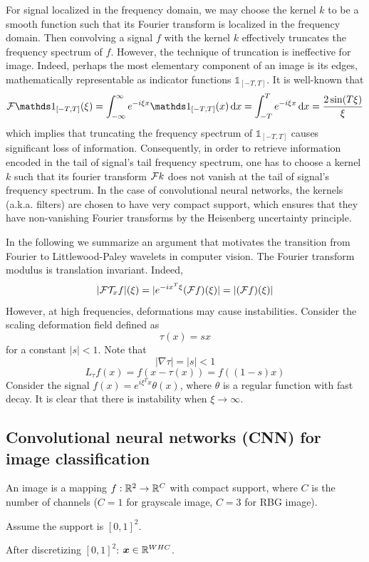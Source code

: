 \documentclass{article}
\newcommand{\ind}{{\mathds 1}}
\begin{document}
For signal localized in the frequency domain, we may choose the kernel $k$ to be a smooth function such that its Fourier transform is localized in the frequency domain.
Then convolving a signal $f$ with the kernel $k$ effectively truncates the frequency spectrum of $f$.
However, the technique of truncation is ineffective for image.
Indeed, perhaps the most elementary component of an image is its edges, mathematically representable as indicator functions $\ind_{[-T, T]}$.
It is well-known that
\[
\calf \ind_{[-T, T]} (\xi)
= \int_{-\infty}^\infty e^{-i \xi x} \ind_{[-T, T]} (x) \dif x
= \int_{-T}^T e^{-i \xi x} \dif x
= \frac{2 \sin (T \xi)}\xi
\]
which implies that truncating the frequency spectrum of $\ind_{[-T, T]}$ causes significant loss of information.
Consequently, in order to retrieve information encoded in the tail of signal's tail frequency spectrum, one has to choose a kernel $k$ such that its fourier transform ${\mathcal F} k$ does not vanish at the tail of signal's frequency spectrum.
In the case of convolutional neural networks, the kernels (a.k.a. filters) are chosen to have very compact support, which ensures that they have non-vanishing Fourier transforms by the Heisenberg uncertainty principle.

In the following we summarize an argument that motivates the transition from Fourier to Littlewood-Paley wavelets in computer vision.
The Fourier transform modulus is translation invariant.
Indeed,
\[
|{\mathcal F} {\mathcal T}_x f| (\xi)
= |e^{-i x^T \xi} ({\mathcal F} f) (\xi)|
= |({\mathcal F} f) (\xi)|
\]
However, at high frequencies, deformations may cause instabilities.
Consider the scaling deformation field defined as
\[
\tau (x) = s x
\]
for a constant $|s| < 1$.
Note that
\[
|\nabla \tau| = |s| < 1
\]
\[
L_\tau f(x) = f(x - \tau (x)) = f((1 - s) x)
\]
Consider the signal $f(x) = e^{i \xi^T x} \theta (x)$, where $\theta$ is a regular function with fast decay.
It is clear that there is instability when $\xi \rightarrow \infty$.

\subsection{Convolutional neural networks (CNN) for image classification}

An image is a mapping $f: {\mathbb R}^2 \rightarrow {\mathbb R}^C$ with compact support, where $C$ is the number of channels ($C = 1$ for grayscale image, $C = 3$ for RBG image).

Assume the support is $[0, 1]^2$.

After discretizing $[0, 1]^2$: ${\bm x} \in {\mathbb R}^{W H C}$.
\end{document}
